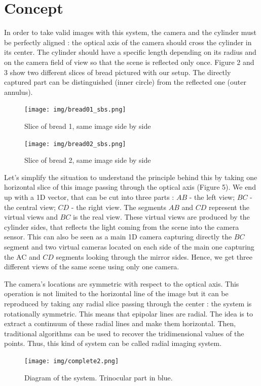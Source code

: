 \documentclass[a4paper,twocolumn,fleqn]{article}
\begin{document}
\section{Concept}
In order to take valid images with this system, the camera and the cylinder must be perfectly aligned : the optical axis of the camera should cross the cylinder in its center. The cylinder should have a specific length depending on its radius and on the camera field of view so that the scene is reflected only once. Figure 2 and 3 show two different slices of bread pictured with our setup. The directly captured part can be distinguished (inner circle) from the reflected one (outer annulus).

\begin{figure}[!b]
  \texttt{[image: img/bread01\_sbs.png]}
  \caption{Slice of bread 1, same image side by side}
  \texttt{[image: img/bread02\_sbs.png]}
  \caption{Slice of bread 2, same image side by side}
\end{figure}

Let's simplify the situation to understand the principle behind this by taking one horizontal slice of this image passing through the optical axis (Figure 5). We end up with a 1D vector, that can be cut into three parts : $AB$ - the left view; $BC$ - the central view; $CD$ - the right view. The segments $AB$ and $CD$ represent the virtual views and $BC$ is the real view. These virtual views are produced by the cylinder sides, that reflects the light coming from the scene into the camera sensor. This can also be seen as a main 1D camera capturing directly the $BC$ segment and two virtual cameras located on each side of the main one capturing the AC and $CD$ segments looking through the mirror sides. Hence, we get three different views of the same scene using only one camera.

The camera's locations are symmetric with respect to the optical axis. This operation is not limited to the horizontal line of the image but it can be reproduced by taking any radial slice passing through the center : the system is rotationally symmetric. This means that epipolar lines are radial. The idea is to extract a continuum of these radial lines and make them horizontal. Then, traditional algorithms can be used to recover the tridimensional values of the points. Thus, this kind of system can be called radial imaging system.

\begin{figure}[!ht]
  \texttt{[image: img/complete2.png]}
  \caption{Diagram of the system. Trinocular part in blue.}
\end{figure}
\end{document}
